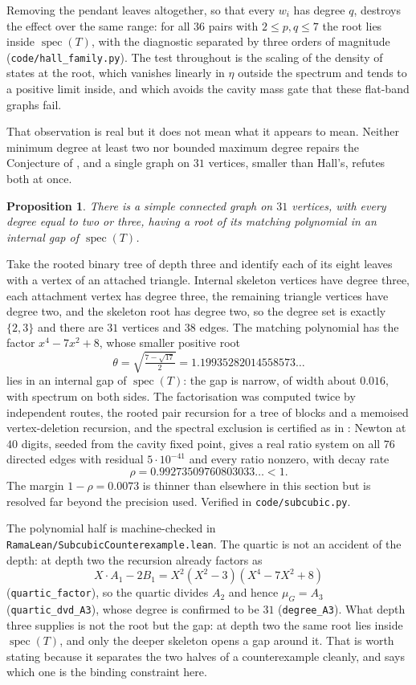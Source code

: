 \documentclass[11pt]{article}
\newtheorem{proposition}[theorem]{Proposition}
\theoremstyle{remark}
\begin{document}
Removing the pendant leaves altogether, so that every $w_i$ has degree $q$, destroys the
effect over the same range: for all $36$ pairs with $2\le p,q\le7$ the root lies inside
$\operatorname{spec}(T)$, with the diagnostic separated by three orders of magnitude
(\texttt{code/hall\_family.py}). The test throughout is the scaling of the density of states
at the root, which vanishes linearly in $\eta$ outside the spectrum and tends to a positive
limit inside, and which avoids the cavity mass gate that these flat-band graphs fail.

That observation is real but it does not mean what it appears to mean. Neither minimum
degree at least two nor bounded maximum degree repairs the Conjecture of \cite{PartI}, and a
single graph on $31$ vertices, smaller than Hall's, refutes both at once.

\begin{proposition}\label{prop:subcubic}
There is a simple connected graph on $31$ vertices, with every degree equal to two or three,
having a root of its matching polynomial in an internal gap of $\operatorname{spec}(T)$.
\end{proposition}

Take the rooted binary tree of depth three and identify each of its eight leaves with a
vertex of an attached triangle. Internal skeleton vertices have degree three, each attachment
vertex has degree three, the remaining triangle vertices have degree two, and the skeleton
root has degree two, so the degree set is exactly $\{2,3\}$ and there are $31$ vertices and
$38$ edges. The matching polynomial has the factor $x^4-7x^2+8$, whose smaller positive root
\[
   \theta=\sqrt{\tfrac{7-\sqrt{17}}{2}}=1.19935282014558573\ldots
\]
lies in an internal gap of $\operatorname{spec}(T)$: the gap is narrow, of width about
$0.016$, with spectrum on both sides. The factorisation was computed twice by independent
routes, the rooted pair recursion for a tree of blocks and a memoised vertex-deletion
recursion, and the spectral exclusion is certified as in \cite{PartI}: Newton at $40$
digits, seeded from the cavity fixed point, gives a real ratio system on all $76$ directed
edges with residual $5\cdot10^{-41}$ and every ratio nonzero, with decay rate
\[
   \rho=0.99273509760803033\ldots<1 .
\]
The margin $1-\rho=0.0073$ is thinner than elsewhere in this section but is resolved far
beyond the precision used. Verified in \texttt{code/subcubic.py}.

The polynomial half is machine-checked in \texttt{RamaLean/SubcubicCounterexample.lean}. The
quartic is not an accident of the depth: at depth two the recursion already factors as
\[
   X\!\cdot\!A_1-2B_1=X^2(X^2-3)(X^4-7X^2+8)
\]
(\texttt{quartic\_factor}), so the quartic divides $A_2$ and hence $\mu_G=A_3$
(\texttt{quartic\_dvd\_A3}), whose degree is confirmed to be $31$
(\texttt{degree\_A3}). What depth three supplies is not the root but the gap: at depth two the
same root lies inside $\operatorname{spec}(T)$, and only the deeper skeleton opens a gap
around it. That is worth stating because it separates the two halves of a counterexample
cleanly, and says which one is the binding constraint here.
\end{document}
